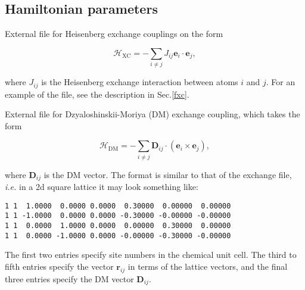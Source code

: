 \documentclass[11pt,fleqn,a4]{book} %
\makeatletter
\newcommand{\litem}[1]{\item[\bfseries#1\index{#1@\texttt{#1}}\label{#1}]}
\newcommand{\rkeyword}[1]{\hyperref[#1]{\texttt{#1}}}
\makeatother
\begin{document}
\subsection{Hamiltonian parameters}
\begin{description}[leftmargin=!,labelwidth=\widthof{\bfseries fifteenchars}]

\litem{exchange}\label{jfile} External file for Heisenberg exchange couplings on the form 

\begin{declaration}
\begin{equation}
\mathcal{H}_{\mathrm{XC}} = - \sum_{i\neq j}J_{ij}  \mathbf{e}_i \cdot \mathbf{e}_j ,
   \label{XC_ham}
\end{equation}
\end{declaration}

\noindent where $J_{ij}$ is the Heisenberg exchange interaction between atoms $i$ and $j$. For an example of the file, see the description in Sec.\ref{fxc}.
\litem{dm} External file for Dzyaloshinskii-Moriya (DM) exchange coupling, which takes the form 

\begin{declaration} 
\begin{equation}
\mathcal{H}_{\mathrm{DM}} = - \sum_{i\neq j}\mathbf{D}_{ij}  \cdot \left(\mathbf{e}_i \times \mathbf{e}_j\right),
  \label{DM_ham}
\end{equation}
\end{declaration}

\noindent where $\mathbf{D}_{ij}$ is the DM vector. The format is similar to that of the exchange file, \textit{i.e.} in a 2d square lattice it may look something like:

\begin{fBox} 
\begin{Verbatim}
1 1  1.0000  0.0000 0.0000  0.30000  0.00000  0.00000
1 1 -1.0000  0.0000 0.0000 -0.30000 -0.00000 -0.00000
1 1  0.0000  1.0000 0.0000  0.00000  0.30000  0.00000
1 1  0.0000 -1.0000 0.0000 -0.00000 -0.30000 -0.00000
\end{Verbatim}
\end{fBox}

The first two entries specify site numbers in the chemical unit cell. The third to fifth entries specify the vector $\mathbf{r}_{ij}$ in terms of the lattice vectors, and the final three entries specify the DM vector $\mathbf{D}_{ij}$. %


\end{description}
\end{document}
